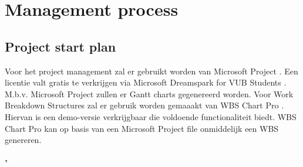 \chapter{Management process}
\section{Project start plan} \label{sec:ProjectStartPlan}
Voor het project management zal er gebruikt worden van Microsoft Project \cite{MicrosoftProject}. Een licentie valt gratis te verkrijgen via Microsoft Dreamspark for VUB Students \cite{DreamsparkVUB}. M.b.v. Microsoft Project zullen er Gantt charts gegenereerd worden. Voor Work Breakdown Structures zal er gebruik worden gemaaakt van WBS Chart Pro \cite{WBSChartPro}. Hiervan is een demo-versie verkrijgbaar die voldoende functionaliteit biedt. WBS Chart Pro kan op basis van een Microsoft Project file onmiddelijk een WBS genereren.
\\
\\
"%
